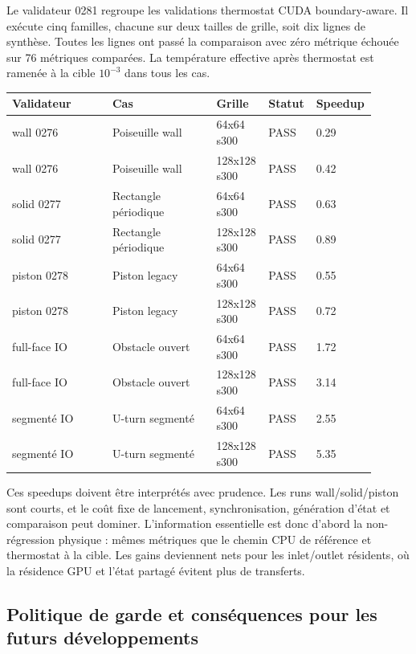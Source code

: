 \documentclass[11pt,a4paper]{article}
\begin{document}
Le validateur 0281 regroupe les validations thermostat CUDA boundary-aware. Il exécute cinq familles, chacune sur deux tailles de grille, soit dix lignes de synthèse. Toutes les lignes ont passé la comparaison avec zéro métrique échouée sur 76 métriques comparées. La température effective après thermostat est ramenée à la cible \(10^{-3}\) dans tous les cas.


\begin{center}
\small
\begin{tabular}{p{0.27\linewidth}p{0.28\linewidth}p{0.14\linewidth}p{0.10\linewidth}p{0.11\linewidth}}
\toprule
Validateur & Cas & Grille & Statut & Speedup \\
\midrule
wall 0276 & Poiseuille wall & 64x64 s300 & PASS & 0.29 \\
wall 0276 & Poiseuille wall & 128x128 s300 & PASS & 0.42 \\
solid 0277 & Rectangle périodique & 64x64 s300 & PASS & 0.63 \\
solid 0277 & Rectangle périodique & 128x128 s300 & PASS & 0.89 \\
piston 0278 & Piston legacy & 64x64 s300 & PASS & 0.55 \\
piston 0278 & Piston legacy & 128x128 s300 & PASS & 0.72 \\
full-face IO & Obstacle ouvert & 64x64 s300 & PASS & 1.72 \\
full-face IO & Obstacle ouvert & 128x128 s300 & PASS & 3.14 \\
segmenté IO & U-turn segmenté & 64x64 s300 & PASS & 2.55 \\
segmenté IO & U-turn segmenté & 128x128 s300 & PASS & 5.35 \\
\bottomrule
\end{tabular}
\end{center}

Ces speedups doivent être interprétés avec prudence. Les runs wall/solid/piston sont courts, et le coût fixe de lancement, synchronisation, génération d'état et comparaison peut dominer. L'information essentielle est donc d'abord la non-régression physique : mêmes métriques que le chemin CPU de référence et thermostat à la cible. Les gains deviennent nets pour les inlet/outlet résidents, où la résidence GPU et l'état partagé évitent plus de transferts.

\subsection{Politique de garde et conséquences pour les futurs développements}
\end{document}
